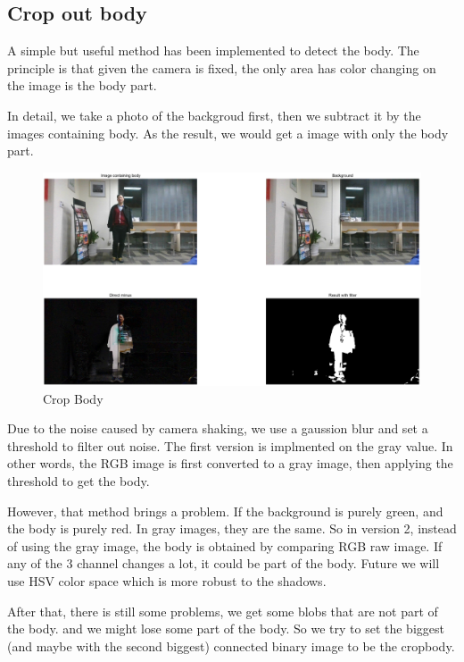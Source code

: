 \documentclass[conference,compsoc]{IEEEtran}
\begin{document}
\subsection{Crop out body}
\par
A simple but useful method has been implemented to detect the body. The principle is that given the camera is fixed, the only area has color changing on the image is the body part.
\par
In detail, we take a photo of the backgroud first, then we subtract it by the images containing body. As the result, we would get a image with only the body part.
\begin{figure}[h]
	\centering
	\includegraphics[width=\linewidth]{./Pic/CropBody.png}
	\caption{Crop Body}
\end{figure}
\par
Due to the noise caused by camera shaking, we use a gaussion blur and set a threshold to filter out noise. The first version is implmented on the gray value. In other words, the RGB image is first converted to a gray image, then applying the threshold to get the body.
\par
However, that method brings a problem. If the background is purely green, and the body is purely red. In gray images, they are the same. So in version 2, instead of using the gray image, the body is obtained by comparing RGB raw image. If any of the 3 channel changes a lot, it could be part of the body. Future we will use HSV color space which is more robust to the shadows.\par
After that, there is still some problems, we get some blobs that are not part of the body. and we might lose some part of the body. So we try to set the biggest (and maybe with the second biggest) connected binary image to be the cropbody.\par
\end{document}

